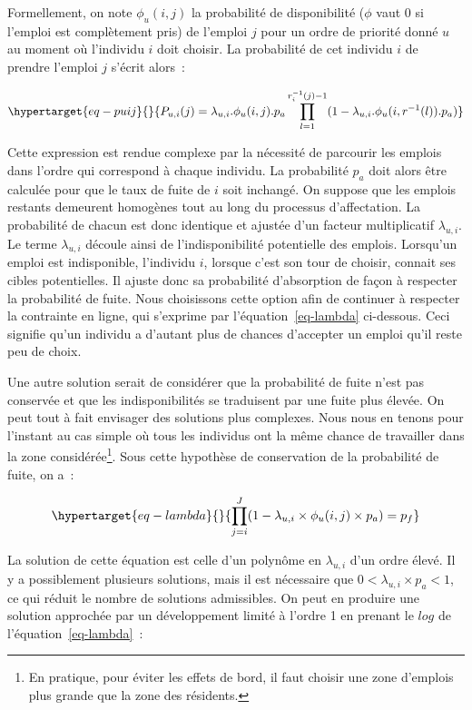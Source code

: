 \documentclass[
  10pt,
  a4paper,
  numbers=noendperiod,
  DIV=9]{scrreprt}
\begin{document}
Formellement, on note \(\phi_u(i,j)\) la probabilité de disponibilité
(\(\phi\) vaut 0 si l'emploi est complètement pris) de l'emploi \(j\)
pour un ordre de priorité donné \(u\) au moment où l'individu \(i\) doit
choisir. La probabilité de cet individu \(i\) de prendre l'emploi \(j\)
s'écrit alors~:

\begin{equation}\protect\hypertarget{eq-puij}{}{
P_{u, i}(j) = \lambda_{u,i}.\phi_u(i,j). p_a \prod_{l=1}^{r_i^{-1}(j)-1}(1-\lambda_{u,i}. \phi_u(i,r^{-1}(l)).p_a)
}\label{eq-puij}\end{equation}

Cette expression est rendue complexe par la nécessité de parcourir les
emplois dans l'ordre qui correspond à chaque individu. La probabilité
\(p_a\) doit alors être calculée pour que le taux de fuite de \(i\) soit
inchangé. On suppose que les emplois restants demeurent homogènes tout
au long du processus d'affectation. La probabilité de chacun est donc
identique et ajustée d'un facteur multiplicatif \(\lambda_{u,i}\). Le
terme \(\lambda_{u,i}\) découle ainsi de l'indisponibilité potentielle
des emplois. Lorsqu'un emploi est indisponible, l'individu \(i\),
lorsque c'est son tour de choisir, connait ses cibles potentielles. Il
ajuste donc sa probabilité d'absorption de façon à respecter la
probabilité de fuite. Nous choisissons cette option afin de continuer à
respecter la contrainte en ligne, qui s'exprime par
l'équation~\ref{eq-lambda} ci-dessous. Ceci signifie qu'un individu a
d'autant plus de chances d'accepter un emploi qu'il reste peu de choix.

Une autre solution serait de considérer que la probabilité de fuite
n'est pas conservée et que les indisponibilités se traduisent par une
fuite plus élevée. On peut tout à fait envisager des solutions plus
complexes. Nous nous en tenons pour l'instant au cas simple où tous les
individus ont la même chance de travailler dans la zone
considérée\footnote{En pratique, pour éviter les effets de bord, il faut
  choisir une zone d'emplois plus grande que la zone des résidents.}.
Sous cette hypothèse de conservation de la probabilité de fuite, on a~:

\begin{equation}\protect\hypertarget{eq-lambda}{}{
\prod_{j=i} ^{J} (1-\lambda_{u,i} \times \phi_u(i,j) \times p_{a})= p_f
}\label{eq-lambda}\end{equation}

La solution de cette équation est celle d'un polynôme en
\(\lambda_{u,i}\) d'un ordre élevé. Il y a possiblement plusieurs
solutions, mais il est nécessaire que \(0<\lambda_{u,i}\times p_a<1\),
ce qui réduit le nombre de solutions admissibles. On peut en produire
une solution approchée par un développement limité à l'ordre 1 en
prenant le \(log\) de l'équation~\ref{eq-lambda}~:
\end{document}
